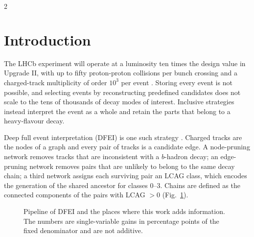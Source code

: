 \documentclass[10pt]{article}
\begin{document}
\vspace{0.5em}
\begin{multicols}{2}

\section{Introduction}

The LHCb experiment will operate at a luminosity ten times the design value in Upgrade II, with up to fifty proton-proton collisions per bunch crossing and a charged-track multiplicity of order $10^3$ per event \cite{upgrade2}. Storing every event is not possible, and selecting events by reconstructing predefined candidates does not scale to the tens of thousands of decay modes of interest. Inclusive strategies instead interpret the event as a whole and retain the parts that belong to a heavy-flavour decay.

Deep full event interpretation (DFEI) is one such strategy \cite{dfei,hgnn}. Charged tracks are the nodes of a graph and every pair of tracks is a candidate edge. A node-pruning network removes tracks that are inconsistent with a $b$-hadron decay; an edge-pruning network removes pairs that are unlikely to belong to the same decay chain; a third network assigns each surviving pair an LCAG class, which encodes the generation of the shared ancestor for classes 0--3. Chains are defined as the connected components of the pairs with LCAG $>0$ (Fig.~\ref{fig:pipe}).

\begin{figure}[H]
\centering
{}
\caption{Pipeline of DFEI and the places where this work adds information. The numbers are single-variable gains in percentage points of the fixed denominator and are not additive.}
\label{fig:pipe}
\end{figure}


\end{multicols}
\end{document}
